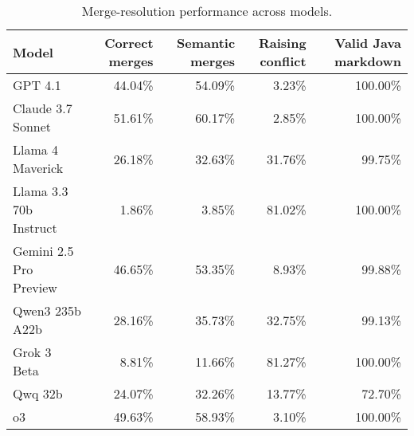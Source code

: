 \begin{table}[ht]
\centering
\begin{tabular}{lrrrr}
\toprule
Model & Correct merges & Semantic merges & Raising conflict & Valid Java markdown \\
\midrule
GPT 4.1 & 44.04\% & 54.09\% & 3.23\% & 100.00\% \\
Claude 3.7 Sonnet & 51.61\% & 60.17\% & 2.85\% & 100.00\% \\
Llama 4 Maverick & 26.18\% & 32.63\% & 31.76\% & 99.75\% \\
Llama 3.3 70b Instruct & 1.86\% & 3.85\% & 81.02\% & 100.00\% \\
Gemini 2.5 Pro Preview & 46.65\% & 53.35\% & 8.93\% & 99.88\% \\
Qwen3 235b A22b & 28.16\% & 35.73\% & 32.75\% & 99.13\% \\
Grok 3 Beta & 8.81\% & 11.66\% & 81.27\% & 100.00\% \\
Qwq 32b & 24.07\% & 32.26\% & 13.77\% & 72.70\% \\
o3 & 49.63\% & 58.93\% & 3.10\% & 100.00\% \\
\bottomrule
\end{tabular}
\caption{Merge-resolution performance across models.}
\end{table}
